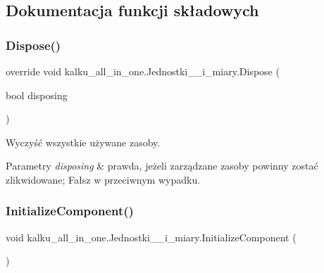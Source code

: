 \subsection{Dokumentacja funkcji składowych}
\mbox{\label{classkalku__all__in__one_1_1_jednostki____i__miary_a15e157831cc6e2a022e200386106d9e6}} 
\subsubsection{\texorpdfstring{Dispose()}{Dispose()}}
{\footnotesize\ttfamily override void kalku\+\_\+all\+\_\+in\+\_\+one.\+Jednostki\+\_\+\+\_\+i\+\_\+miary.\+Dispose (\begin{DoxyParamCaption}\item[{bool}]{disposing }\end{DoxyParamCaption})\hspace{0.3cm}{\ttfamily [protected]}}



Wyczyść wszystkie używane zasoby. 


\begin{DoxyParams}{Parametry}
{\em disposing} & prawda, jeżeli zarządzane zasoby powinny zostać zlikwidowane; Fałsz w przeciwnym wypadku.\\
\hline
\end{DoxyParams}
\mbox{\label{classkalku__all__in__one_1_1_jednostki____i__miary_a1d42f7bc7cd880252b7d32adde5633d7}} 
\subsubsection{\texorpdfstring{InitializeComponent()}{InitializeComponent()}}
{\footnotesize\ttfamily void kalku\+\_\+all\+\_\+in\+\_\+one.\+Jednostki\+\_\+\+\_\+i\+\_\+miary.\+Initialize\+Component (\begin{DoxyParamCaption}{ }\end{DoxyParamCaption})\hspace{0.3cm}{\ttfamily [private]}}



